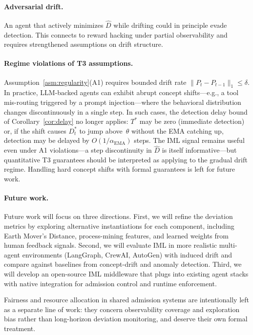 \documentclass[11pt]{article}
\newcommand{\Dhat}{\widehat{D}}
\begin{document}
\paragraph{Adversarial drift.}
An agent that actively minimizes $\Dhat$ while drifting could in principle
evade detection.  This connects to reward hacking under partial observability
and requires strengthened assumptions on drift structure.

\paragraph{Regime violations of T3 assumptions.}
Assumption~\ref{asm:regularity}(A1) requires bounded drift rate
$\|P_t - P_{t-1}\|_1 \leq \delta$.  In practice, LLM-backed agents can
exhibit abrupt concept shifts---e.g., a tool mis-routing triggered by a
prompt injection---where the behavioral distribution changes discontinuously
in a single step.  In such cases, the detection delay bound of
Corollary~\ref{cor:delay} no longer applies: $T^*$ may be zero (immediate
detection) or, if the shift causes $D_t^*$ to jump above~$\theta$ without
the EMA catching up, detection may be delayed by $O(1/\alpha_{\mathrm{EMA}})$
steps.  The IML signal remains useful even under A1 violations---a step
discontinuity in $\Dhat$ is itself informative---but quantitative T3 guarantees
should be interpreted as applying to the gradual drift regime.
Handling hard concept shifts with formal guarantees is left for future work.

\paragraph{Future work.}
Future work will focus on three directions.  First, we will refine the
deviation metrics by exploring alternative instantiations for each component,
including Earth Mover's Distance, process-mining features, and learned weights
from human feedback signals.  Second, we will evaluate IML in more realistic
multi-agent environments (LangGraph, CrewAI, AutoGen) with induced drift and
compare against baselines from concept-drift and anomaly detection.  Third,
we will develop an open-source IML middleware that plugs into existing agent
stacks with native integration for admission control and runtime enforcement.

Fairness and resource allocation in shared admission systems are
intentionally left as a separate line of work: they concern observability
coverage and exploration bias rather than long-horizon deviation monitoring,
and deserve their own formal treatment.
\end{document}
